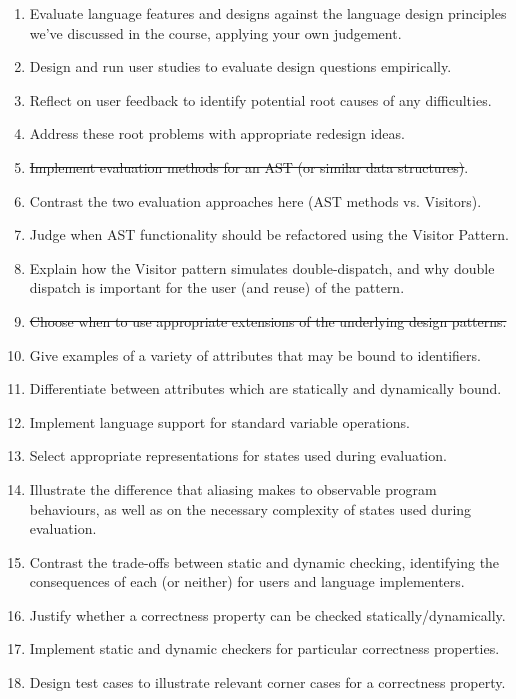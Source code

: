 \documentclass{article}
\begin{document}
\begin{itemize}
\begin{enumerate}
        \item Evaluate language features and designs against the language design principles we've discussed in the course, applying your own judgement.
        \item Design and run user studies to evaluate design questions empirically.
        \item Reflect on user feedback to identify potential root causes of any difficulties.
        \item Address these root problems with appropriate redesign ideas.
        \item \sout{Implement evaluation methods for an AST (or similar data structures)}.
        \item Contrast the two evaluation approaches here (AST methods vs. Visitors).
        \item Judge when AST functionality should be refactored using the Visitor Pattern.
        \item Explain how the Visitor pattern simulates double-dispatch, and why double dispatch is important for the user (and reuse) of the pattern.
        \item \sout{Choose when to use appropriate extensions of the underlying design patterns.}
        \item Give examples of a variety of attributes that may be bound to identifiers.
        \item Differentiate between attributes which are statically and dynamically bound.
        \item Implement language support for standard variable operations.
        \item Select appropriate representations for states used during evaluation.
        \item Illustrate the difference that aliasing makes to observable program behaviours, as well as on the necessary complexity of states used during evaluation.
        \item Contrast the trade-offs between static and dynamic checking, identifying the consequences of each (or neither) for users and language implementers.
        \item Justify whether a correctness property can be checked statically/dynamically.
        \item Implement static and dynamic checkers for particular correctness properties.
        \item Design test cases to illustrate relevant corner cases for a correctness property.
    \end{enumerate}

\end{itemize}
\end{document}
